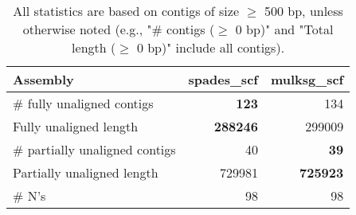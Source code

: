 \documentclass[12pt,a4paper]{article}
\begin{document}
\begin{table}[ht]
\begin{center}
\caption{All statistics are based on contigs of size $\geq$ 500 bp, unless otherwise noted (e.g., "\# contigs ($\geq$ 0 bp)" and "Total length ($\geq$ 0 bp)" include all contigs).}
\begin{tabular}{|l*{2}{|r}|}
\hline
Assembly & spades\_scf & mulksg\_scf \\ \hline
\# fully unaligned contigs & {\bf 123} & 134 \\ \hline
Fully unaligned length & {\bf 288246} & 299009 \\ \hline
\# partially unaligned contigs & 40 & {\bf 39} \\ \hline
Partially unaligned length & 729981 & {\bf 725923} \\ \hline
\# N's & 98 & 98 \\ \hline
\end{tabular}
\end{center}
\end{table}
\end{document}

